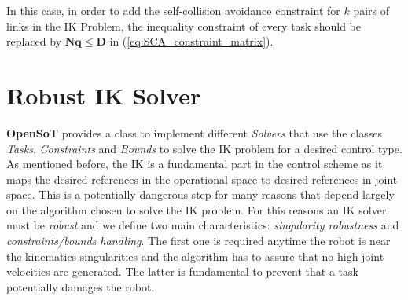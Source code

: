 In this case, in order to add the self-collision avoidance constraint for $ k $ pairs of links in the IK Problem, the inequality constraint of every task should be replaced by $ \bm{N} \dot{\bm{q}} \leq \bm{D} $ in (\ref{eq:SCA_constraint_matrix}).


\section{Robust IK Solver}
\label{sec:robust_ik_solver}
\textbf{OpenSoT} provides a class to implement different \emph{Solvers} that use the classes \emph{Tasks}, \emph{Constraints} and \emph{Bounds} to solve the IK problem for a desired control type.
As mentioned before, the IK is a fundamental part in the control scheme as it maps the desired references in the operational space to desired references in joint space. This is a potentially dangerous step for many reasons that depend largely on the algorithm chosen to solve the IK problem.
For this reasons an IK solver must be \emph{robust} and we define two main characteristics: \emph{singularity robustness} and \emph{constraints/bounds handling}.
The first one is required anytime the robot is near the kinematics singularities and the algorithm has to assure that no high joint velocities are generated.
The latter is fundamental to prevent that a task potentially damages the robot. 

